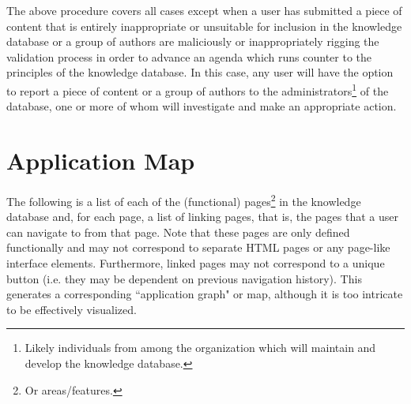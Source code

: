 \documentclass[12pt,letterpaper]{article}
\begin{document}
The above procedure covers all cases except when a user has submitted a piece of content that is entirely inappropriate or unsuitable for inclusion in the knowledge database or a group of authors are maliciously or inappropriately rigging the validation process in order to advance an agenda which runs counter to the principles of the knowledge database. In this case, any user will have the option to report a piece of content or a group of authors to the administrators\footnote{Likely individuals from among the organization which will maintain and develop the knowledge database.} of the database, one or more of whom will investigate and make an appropriate action. 






\section{Application Map}

The following is a list of each of the (functional) pages\footnote{Or areas/features.} in the knowledge database and, for each page, a list of linking pages, that is, the pages that a user can navigate to from that page. Note that these pages are only defined functionally and may not correspond to separate HTML pages or any page-like interface elements. Furthermore, linked pages may not correspond to a unique button (i.e. they may be dependent on previous navigation history). This generates a corresponding ``application graph" or map, although it is too intricate to be effectively visualized. 
\end{document}
